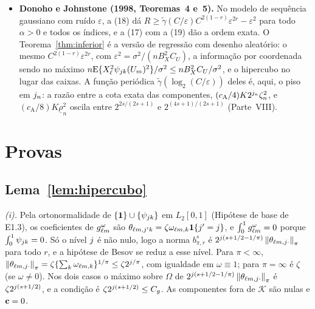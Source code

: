 \documentclass[11pt,a4paper]{article}
\newcommand{\Kcal}{\mathcal{K}}
\newcommand{\rlow}{\underline{\rho}_{n}}
\newcommand{\cA}{c_{\mathrm{A}}}
\begin{document}
\begin{itemize}[leftmargin=*]
    é o Teorema~\ref{thm:inferior}(i) com $K$ igual ao número de funções não
    constantes e $B_{X}^{2}C_{U}$ no lugar de $\omega^{*}_{\max}\phi_{\max}$.
    A construção deles (5.4) é um hipercubo denso nos índices $l_{0}$ a
    $2l_{0}-1$ da base. O que eles não têm: a perda de predição, $q \ge 2$
    com os termos cruzados, $\bX$ dependente de $\bU$. O que este arquivo não
    tem: o regime $p \gg n$ e o termo de suporte.
  \item \textbf{Donoho e Johnstone (1998, Teoremas~4 e~5).} No modelo de
    sequência gaussiano com ruído $\varepsilon$, a (18) dá $R \ge
    \tilde\gamma(C/\varepsilon)C^{2(1-r)}\varepsilon^{2r} - \varepsilon^{2}$
    para todo $\alpha > 0$ e todos os índices, e a (17) com a (19) dão a
    ordem exata. O Teorema~\ref{thm:inferior} é a versão de regressão com
    desenho aleatório: o mesmo $C^{2(1-r)}\varepsilon^{2r}$, com
    $\varepsilon^{2} = \sigma^{2}/(nB_{X}^{2}C_{U})$, a informação por
    coordenada sendo no máximo $n\mathrm{E}\{X_{\ell}^{2}\psi_{jk}(U_{m})^{2}\}
    /\sigma^{2} \le nB_{X}^{2}C_{U}/\sigma^{2}$, e o hipercubo no lugar das
    caixas. A função periódica $\tilde\gamma(\log_{2}(C/\varepsilon))$ deles
    é, aqui, o piso em $j_{n}$: a razão entre a cota exata das componentes,
    $(\cA/4)K2^{\lev_{n}}\zeta_{n}^{2}$, e $(\cA/8)K\rlow^{2}$ oscila entre
    $2^{2s/(2s+1)}$ e $2^{(4s+1)/(2s+1)}$ (Parte~VIII).
\end{itemize}

\section{Provas}\label{sec:provas}

\subsection*{Lema~\ref{lem:hipercubo}}

\emph{(i).} Pela ortonormalidade de $\{\mathbf{1}\}\cup\{\psi_{jk}\}$
em $L_{2}[0,1]$ (Hipótese de base de E1.3), os coeficientes de
$g_{\ell m}^{\omega}$ são $\theta_{\ell m,j'k} =
\zeta\omega_{\ell m,k}\mathbf{1}\{j' = j\}$, e
$\int_{0}^{1}g_{\ell m}^{\omega} = 0$ porque $\int_{0}^{1}\psi_{jk}
= 0$. Só o nível $j$ é não nulo, logo a norma $b^{s}_{\pi,r}$ é
$2^{j(s+1/2-1/\pi)}\left\lVert \theta_{\ell m,j\cdot} \right\rVert_{\pi}$ para todo $r$, e a
hipótese de Besov se reduz a esse nível. Para $\pi < \infty$,
$\left\lVert \theta_{\ell m,j\cdot} \right\rVert_{\pi} = \zeta\{\sum_{k}\omega_{\ell m,k}\}^{1/\pi}
\le \zeta2^{j/\pi}$, com igualdade em $\omega \equiv 1$; para $\pi = \infty$
é $\zeta$ (se $\omega \ne 0$). Nos dois casos o máximo sobre $\Omega$ de
$2^{j(s+1/2-1/\pi)}\left\lVert \theta_{\ell m,j\cdot} \right\rVert_{\pi}$ é
$\zeta2^{j(s+1/2)}$, e a condição é $\zeta2^{j(s+1/2)} \le C_{g}$. As
componentes fora de $\Kcal$ são nulas e $\mathbf{c} = 0$.
\end{document}
